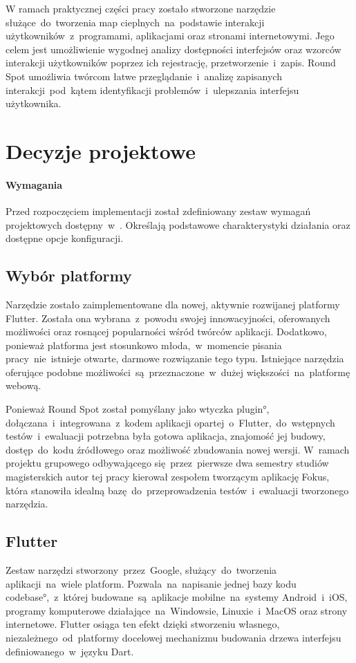 W ramach praktycznej części pracy zostało stworzone narzędzie służące~do~tworzenia map cieplnych~na~podstawie interakcji użytkowników~z~programami, aplikacjami oraz stronami internetowymi. Jego celem jest umożliwienie wygodnej analizy dostępności interfejsów oraz wzorców interakcji użytkowników poprzez ich rejestrację, przetworzenie~i~zapis. Round Spot umożliwia twórcom łatwe przeglądanie~i~analizę zapisanych interakcji~pod~kątem identyfikacji problemów~i~ulepszania interfejsu użytkownika.

\section{Decyzje projektowe}

\paragraph{Wymagania} Przed rozpoczęciem implementacji został zdefiniowany zestaw wymagań projektowych dostępny~w~. Określają podstawowe charakterystyki działania oraz dostępne opcje konfiguracji.

\subsection{Wybór platformy}
Narzędzie zostało zaimplementowane dla nowej, aktywnie rozwijanej platformy Flutter. Została ona wybrana~z~powodu swojej innowacyjności, oferowanych możliwości oraz rosnącej popularności wśród twórców aplikacji. Dodatkowo, ponieważ platforma jest stosunkowo młoda,~w~momencie pisania pracy~nie~istnieje otwarte, darmowe rozwiązanie tego typu. Istniejące narzędzia oferujące podobne możliwości~są~przeznaczone~w~dużej większości~na~platformę webową.

Ponieważ Round Spot został pomyślany jako wtyczka \ang{plugin}, dołączana~i~integrowana~z~kodem aplikacji opartej~o~Flutter,~do~wstępnych testów~i~ewaluacji potrzebna była gotowa aplikacja, znajomość jej budowy, dostęp~do~kodu źródłowego oraz możliwość zbudowania nowej wersji. W~ramach projektu grupowego odbywającego się~przez~pierwsze dwa semestry studiów magisterskich autor tej pracy kierował zespołem tworzącym aplikację Fokus, która stanowiła idealną bazę~do~przeprowadzenia testów~i~ewaluacji tworzonego narzędzia.

\subsection{Flutter}
Zestaw narzędzi stworzony~przez~Google, służący~do~tworzenia aplikacji~na~wiele platform. Pozwala~na~napisanie jednej bazy kodu \ang{codebase},~z~której budowane~są~aplikacje mobilne~na~systemy Android~i~iOS, programy komputerowe działające~na~Windowsie, Linuxie~i~MacOS oraz strony internetowe. Flutter osiąga ten efekt dzięki stworzeniu własnego, niezależnego~od~platformy docelowej mechanizmu budowania drzewa interfejsu definiowanego~w~języku Dart. 

